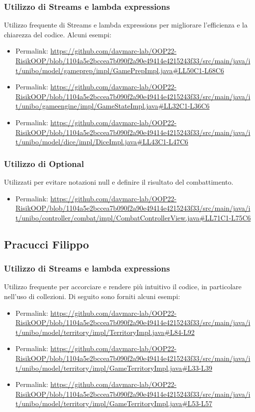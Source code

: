 \documentclass[a4paper,12pt]{report}
\begin{document}
\subsubsection*{Utilizzo di Streams e lambda expressions}
%
Utilizzo frequente di Streams e lambda expressions per migliorare l'efficienza e la chiarezza del codice. Alcuni esempi:
\begin{itemize}
    \item Permalink: \url{https://github.com/davmarc-lab/OOP22-RisikOOP/blob/1104a5e2bccea7b090f2a90e49414e4215243f33/src/main/java/it/unibo/model/gameprep/impl/GamePrepImpl.java#LL50C1-L68C6}
    \item Permalink: \url{https://github.com/davmarc-lab/OOP22-RisikOOP/blob/1104a5e2bccea7b090f2a90e49414e4215243f33/src/main/java/it/unibo/gameengine/impl/GameStateImpl.java#LL32C1-L36C6}
    \item Permalink: \url{https://github.com/davmarc-lab/OOP22-RisikOOP/blob/1104a5e2bccea7b090f2a90e49414e4215243f33/src/main/java/it/unibo/model/dice/impl/DiceImpl.java#LL43C1-L47C6}
\end{itemize}
%
\subsubsection*{Utilizzo di Optional}
%
Utilizzati per evitare notazioni null e definire il risultato del combattimento.
\begin{itemize}
    \item Permalink: \url{https://github.com/davmarc-lab/OOP22-RisikOOP/blob/1104a5e2bccea7b090f2a90e49414e4215243f33/src/main/java/it/unibo/controller/combat/impl/CombatControllerView.java#LL71C1-L75C6}
\end{itemize}
%
\subsection*{Pracucci Filippo}
%
\subsubsection*{Utilizzo di Streams e lambda expressions}
%
Utilizzo frequente per accorciare e rendere pi\`u intuitivo il codice, in particolare nell'uso di collezioni. Di seguito sono forniti alcuni esempi:
\begin{itemize}
    \item Permalink: \url{https://github.com/davmarc-lab/OOP22-RisikOOP/blob/1104a5e2bccea7b090f2a90e49414e4215243f33/src/main/java/it/unibo/model/territory/impl/TerritoryImpl.java#L84-L92}
    \item Permalink: \url{https://github.com/davmarc-lab/OOP22-RisikOOP/blob/1104a5e2bccea7b090f2a90e49414e4215243f33/src/main/java/it/unibo/model/territory/impl/GameTerritoryImpl.java#L33-L39}
    \item Permalink: \url{https://github.com/davmarc-lab/OOP22-RisikOOP/blob/1104a5e2bccea7b090f2a90e49414e4215243f33/src/main/java/it/unibo/model/territory/impl/GameTerritoryImpl.java#L53-L57}
\end{itemize}
%
\end{document}
